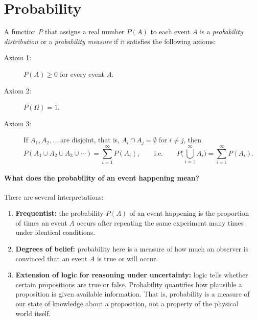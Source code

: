 \section{Probability}
\begin{definition}[Probability]
A function $P$ that assigns a real number $P(A)$ to each event $A$ is a \emph{probability distribution} or a \emph{probability measure} if it satisfies the following axioms:
\begin{description}
\item[Axiom 1:] $P(A) \ge 0$ for every event $A$.
\item[Axiom 2:] $P(\Omega) = 1$.
\item[Axiom 3:] If $A_1, A_2, \dots$ are disjoint, that is, $A_i \cap A_j = \emptyset$ for $i \ne j$, then
\[
P(A_1 \cup A_2 \cup A_3 \cup \cdots) = \sum_{i=1}^{\infty} P(A_i),
\qquad\text{i.e.}\qquad
P\Big(\bigcup_{i=1}^{\infty} A_i\Big) = \sum_{i=1}^{\infty} P(A_i).
\]
\end{description}
\end{definition}

\paragraph{What does the probability of an event happening mean?}
There are several interpretations:
\begin{enumerate}[label=(\roman*)]
\item \textbf{Frequentist:} the probability $P(A)$ of an event happening is the proportion of times an event $A$ occurs after repeating the same experiment many times under identical conditions.
\item \textbf{Degrees of belief:} probability here is a measure of how much an observer is convinced that an event $A$ is true or will occur.
\item \textbf{Extension of logic for reasoning under uncertainty:} logic tells whether certain propositions are true or false. Probability quantifies how plausible a proposition is given available information. That is, probability is a measure of our state of knowledge about a proposition, not a property of the physical world itself.
\end{enumerate}

